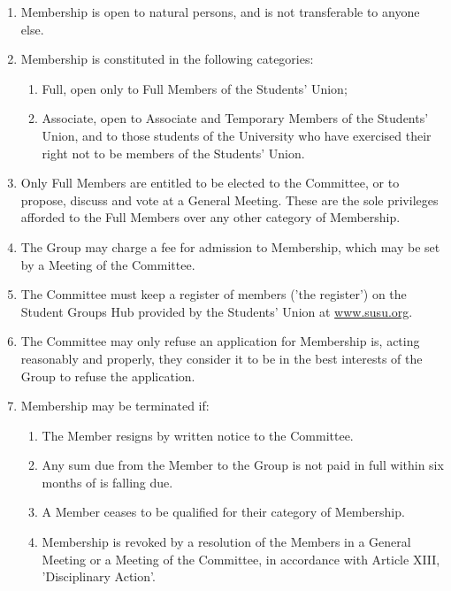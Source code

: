 \documentclass[12pt]{constitution}
\begin{document}
\begin{enumerate}
    \item Membership is open to natural persons, and is not transferable to anyone else.
    \item Membership is constituted in the following categories:
    \begin{enumerate}
        \item Full, open only to Full Members of the Students' Union;
        \item Associate, open to Associate and Temporary Members of the Students' Union, and to those students of the University who have exercised their right not to be members of the Students' Union.
    \end{enumerate}
    \item Only Full Members are entitled to be elected to the Committee, or to propose, discuss and vote at a General Meeting. These are the sole privileges afforded to the Full Members over any other category of Membership.
    \item The Group may charge a fee for admission to Membership, which may be set by a Meeting of the Committee.
    \item The Committee must keep a register of members ('the register') on the Student Groups Hub provided by the Students' Union at \url{www.susu.org}.
    \item The Committee may only refuse an application for Membership is, acting reasonably and properly, they consider it to be in the best interests of the Group to refuse the application.
    \item Membership may be terminated if:
    \begin{enumerate}
        \item The Member resigns by written notice to the Committee.
        \item Any sum due from the Member to the Group is not paid in full within six months of is falling due.
        \item A Member ceases to be qualified for their category of Membership.
        \item Membership is revoked by a resolution of the Members in a General Meeting or a Meeting of the Committee, in accordance with Article XIII, 'Disciplinary Action'.
    \end{enumerate}
\end{enumerate}

\end{document}
